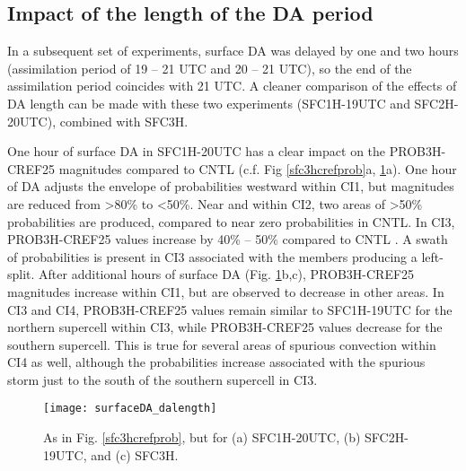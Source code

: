 \subsection{Impact of the length of the DA period}
In a subsequent set of experiments, surface DA was delayed by one and two hours (assimilation period of 19 -- 21 UTC and 20 -- 21 UTC), so the end of the assimilation period coincides with 21 UTC. A cleaner comparison of the effects of DA length can be made with these two experiments (SFC1H-19UTC and SFC2H-20UTC), combined with SFC3H.

One hour of surface DA in SFC1H-20UTC has a clear impact on the PROB3H-CREF25 magnitudes compared to CNTL (c.f. Fig \ref{sfc3hcrefprob}a, \ref{sfc3hdalength}a). One hour of DA adjusts the envelope of probabilities westward within CI1, but magnitudes are reduced from \textgreater 80\% to  \textless 50\%. Near and within CI2, two areas of \textgreater 50\% probabilities are produced, compared to near zero probabilities in CNTL. In CI3, PROB3H-CREF25 values increase by 40\% -- 50\% compared to CNTL . A swath of probabilities is present in CI3 associated with the members producing a left-split. After additional hours of surface DA (Fig. \ref{sfc3hdalength}b,c), PROB3H-CREF25 magnitudes increase within CI1, but are observed to decrease in other areas. In CI3 and CI4, PROB3H-CREF25 values remain similar to SFC1H-19UTC for the northern supercell within CI3, while PROB3H-CREF25 values decrease for the southern supercell. This is true for several areas of spurious convection within CI4 as well, although the probabilities increase associated with the spurious storm just to the south of the southern supercell in CI3.

\begin{figure}
\centering
\texttt{[image: surfaceDA\_dalength]}
\caption{As in Fig. \ref{sfc3hcrefprob}, but for (a) SFC1H-20UTC, (b) SFC2H-19UTC, and (c) SFC3H.}
\label{sfc3hdalength}
\end{figure}

